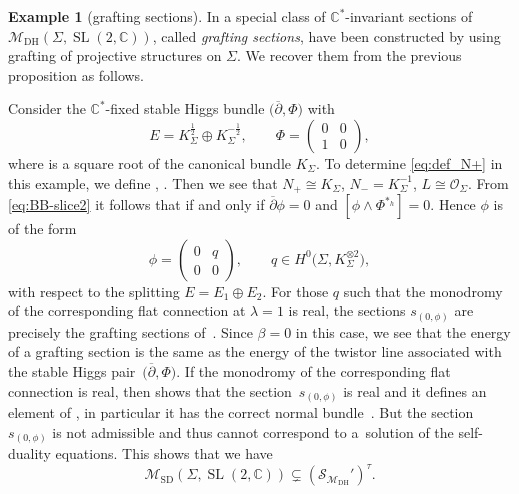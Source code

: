 \documentclass[pdftex]{sigma}
\numberwithin{equation}{section}
\theoremstyle{definition}
\newtheorem{Example}[Theorem]{Example}
\newcommand\C{{\mathbb C}}
\begin{document}
\begin{Example}[{grafting sections}]\label{ex:grafting}
In \cite{Hel} a special class of $\C^*$-invariant sections of $\mathcal{M}_{\mathrm{DH}}(\Sigma, \allowbreak\operatorname{SL}(2,\C))$, called \emph{grafting sections}, have been constructed by using grafting of projective structures on $\Sigma$.
We recover them from the previous proposition as follows.
	
Consider the $\C^*$-fixed stable Higgs bundle $\bigl({\overline{\partial}}, \Phi\bigr)$ with
\[
E = K_\Sigma^{\frac{1}{2}}\oplus K^{-\frac{1}{2}}_\Sigma, \qquad
\Phi =
\begin{pmatrix}
0 & 0 \\
1 & 0
\end{pmatrix},
\]
where  is a square root of the canonical bundle $K_\Sigma$.
To determine \eqref{eq:def_N+} in this example, we define , .
Then we see that
$
N_+\cong K_\Sigma$, $ N_-=K^{-1}_\Sigma$, $ L \cong \mathcal{O}_\Sigma$. From \eqref{eq:BB-slice2} it follows
that  if and only if ${\overline{\partial}} \phi = 0$ and
$[\phi\wedge\Phi^{*_h}] = 0$.
Hence $\phi$ is of the form
\[
\phi = \begin{pmatrix}
0 & q \\
0 & 0
\end{pmatrix},\qquad q \in H^0\big(\Sigma, K_\Sigma^{\otimes 2}\big),
\]
with respect to the splitting $E = E_1\oplus E_2$.
For those $q$ such that the monodromy of the corresponding flat connection at $\lambda = 1$ is real, the
sections $s_{(0,\phi)}$ are precisely the grafting sections of~\cite[Section~2.1]{Hel}. Since $\beta = 0$ in
this case, we see that the energy of a grafting section is the same as the energy of the twistor line
associated with the stable Higgs pair~$\bigl({\overline{\partial}}, \Phi\bigr)$. If the monodromy of the corresponding flat
connection is real, then \cite{Hel} shows that the section~$s_{(0,\phi)}$ is real and
it defines an element of , in particular it has the correct normal bundle~\smash{$\mathcal{O}_{\C P^1}(1)^{\oplus 2d}$}. But the section $s_{(0,\phi)}$ is not admissible and thus cannot correspond
to a~solution of the self-duality equations. This shows that we have
\[\mathcal{M}_{\mathrm{SD}}(\Sigma,\operatorname{SL}(2,\C)) \subsetneq (\mathcal S_{\mathcal{M}_{\mathrm{DH}}}')^\tau.\]
\end{Example}
\end{document}
